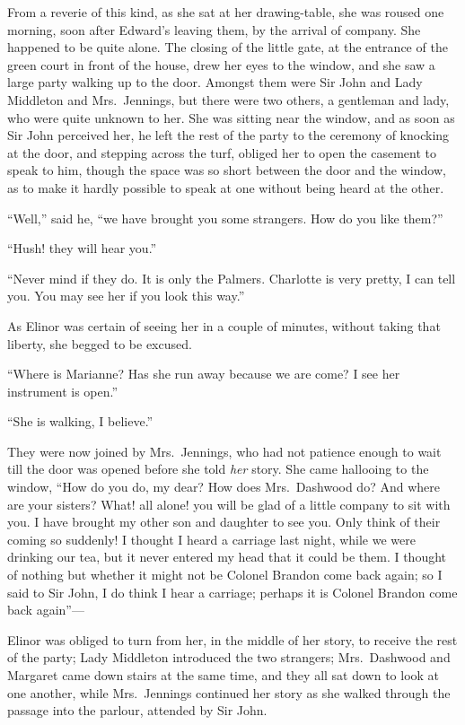 \documentclass{article}
\begin{document}
From a reverie of this kind, as she sat at her
drawing-table, she was roused one morning, soon after
Edward's leaving them, by the arrival of company.
She happened to be quite alone.  The closing of the
little gate, at the entrance of the green court in front
of the house, drew her eyes to the window, and she saw
a large party walking up to the door.  Amongst them
were Sir John and Lady Middleton and Mrs.\ Jennings,
but there were two others, a gentleman and lady, who were
quite unknown to her.  She was sitting near the window,
and as soon as Sir John perceived her, he left the rest
of the party to the ceremony of knocking at the door,
and stepping across the turf, obliged her to open the
casement to speak to him, though the space was so short
between the door and the window, as to make it hardly
possible to speak at one without being heard at the other.

``Well,'' said he, ``we have brought you some strangers.
How do you like them?''

``Hush! they will hear you.''

``Never mind if they do.  It is only the Palmers.
Charlotte is very pretty, I can tell you.  You may see her
if you look this way.''

As Elinor was certain of seeing her in a couple
of minutes, without taking that liberty, she begged
to be excused.

``Where is Marianne? Has she run away because we
are come? I see her instrument is open.''

``She is walking, I believe.''

They were now joined by Mrs.\ Jennings, who had not
patience enough to wait till the door was opened before
she told \emph{her} story.  She came hallooing to the window,
``How do you do, my dear?  How does Mrs.\ Dashwood do?
And where are your sisters?  What! all alone! you
will be glad of a little company to sit with you.
I have brought my other son and daughter to see you.
Only think of their coming so suddenly!  I thought I heard
a carriage last night, while we were drinking our tea,
but it never entered my head that it could be them.
I thought of nothing but whether it might not be Colonel
Brandon come back again; so I said to Sir John, I do think
I hear a carriage; perhaps it is Colonel Brandon come
back again''---%

Elinor was obliged to turn from her, in the middle
of her story, to receive the rest of the party; Lady
Middleton introduced the two strangers; Mrs.\ Dashwood
and Margaret came down stairs at the same time, and they
all sat down to look at one another, while Mrs.\ Jennings
continued her story as she walked through the passage
into the parlour, attended by Sir John.
\end{document}
